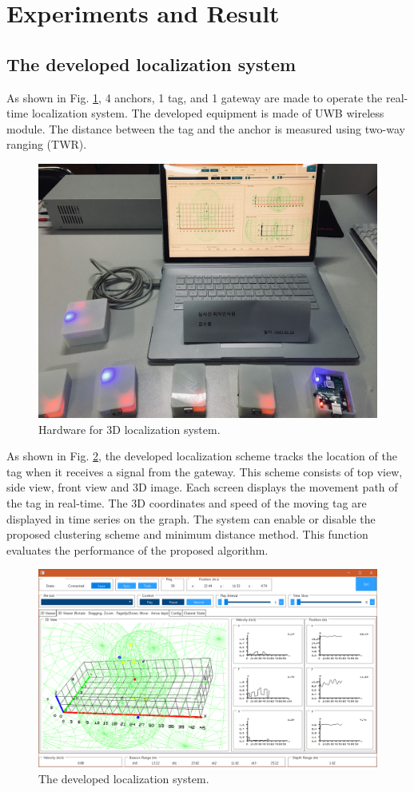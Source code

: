 \documentclass[conference]{IEEEtran}
\begin{document}
\section{Experiments and Result}
\subsection{The developed localization system}

As shown in Fig. \ref{fig10}, 4 anchors, 1 tag, and 1 gateway are made to operate the real-time localization system. The developed equipment is made of UWB wireless module. The distance between the tag and the anchor is measured using two-way ranging (TWR).

\begin{figure}[htbp]
    \centerline{\includegraphics[width=0.62\columnwidth]{fig10.jpg}}
    \caption{Hardware for 3D localization system.}
    \label{fig10}
\end{figure}

As shown in Fig. \ref{fig5}, the developed localization scheme tracks the location of the tag when it receives a signal from the gateway. This scheme consists of top view, side view, front view and 3D image. Each screen displays the movement path of the tag in real-time. The 3D coordinates and speed of the moving tag are displayed in time series on the graph. The system can enable or disable the proposed clustering scheme and minimum distance method. This function evaluates the performance of the proposed algorithm.

\begin{figure}[htbp]
    \centerline{\includegraphics[width=0.62\columnwidth]{fig5.png}}
    \caption{The developed localization system.}
    \label{fig5}
\end{figure}
\end{document}
